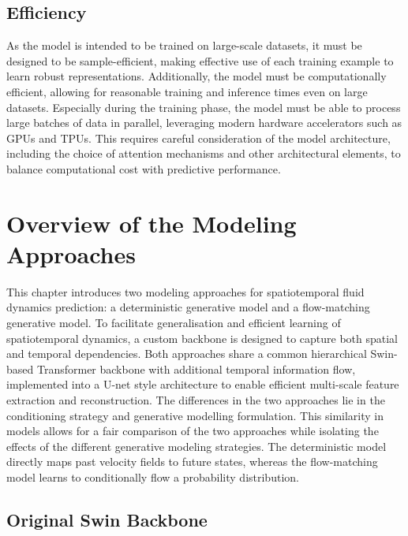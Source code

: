 \subsection{Efficiency}

As the model is intended to be trained on large-scale datasets, it must be designed to be sample-efficient, making effective use of each training example to learn robust representations. Additionally, the model must be computationally efficient, allowing for reasonable training and inference times even on large datasets. Especially during the training phase, the model must be able to process large batches of data in parallel, leveraging modern hardware accelerators such as GPUs and TPUs. This requires careful consideration of the model architecture, including the choice of attention mechanisms and other architectural elements, to balance computational cost with predictive performance.

\section{Overview of the Modeling Approaches}

This chapter introduces two modeling approaches for spatiotemporal fluid dynamics prediction: a deterministic generative model and a flow-matching generative model. To facilitate generalisation and efficient learning of spatiotemporal dynamics, a custom backbone is designed to capture both spatial and temporal dependencies. Both approaches share a common hierarchical Swin-based Transformer backbone with additional temporal information flow, implemented into a U-net style architecture to enable efficient multi-scale feature extraction and reconstruction. The differences in the two approaches lie in the conditioning strategy and generative modelling formulation. This similarity in models allows for a fair comparison of the two approaches while isolating the effects of the different generative modeling strategies. The deterministic model directly maps past velocity fields to future states, whereas the flow-matching model learns to conditionally flow a probability distribution.

\subsection{Original Swin Backbone}

